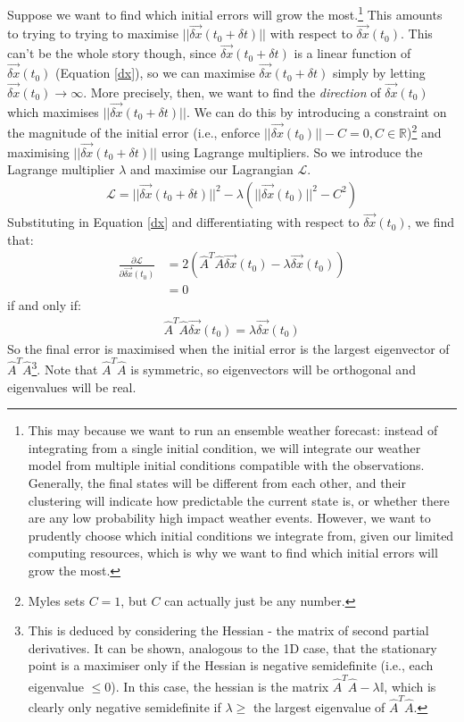 Suppose we want to find which initial errors will grow the most.\footnote{This may because we want to run an ensemble weather forecast: instead of integrating from a single initial condition, we will integrate our weather model from multiple initial conditions compatible with the observations. Generally, the final states will be different from each other, and their clustering will indicate how predictable the current state is, or whether there are any low probability high impact weather events. However, we want to prudently choose which initial conditions we integrate from, given our limited computing resources, which is why we want to find which initial errors will grow the most.}
This amounts to trying to trying to maximise $||\vec{\delta x}(t_0+\delta t)||$ with respect to $\vec{\delta x}(t_0)$. This can't be the whole story though, since $\vec{\delta x}(t_0+\delta t)$ is a linear function of $\vec{\delta x}(t_0)$ (Equation \ref{dx}), so we can maximise $\vec{\delta x}(t_0+\delta t)$ simply by letting $\vec{\delta x}(t_0)\to\infty$. More precisely, then, we want to find the \textit{direction} of $\vec{\delta x}(t_0)$ which maximises $||\vec{\delta x}(t_0+\delta t)||$. We can do this by introducing a constraint on the magnitude of the initial error (i.e., enforce $||\vec{\delta x}(t_0)||-C=0,C\in\mathbb{R}$)\footnote{Myles sets $C=1$, but $C$ can actually just be any number.} and maximising $||\vec{\delta x}(t_0+\delta t)||$ using Lagrange multipliers. So we introduce the Lagrange multiplier $\lambda$ and maximise our Lagrangian $\mathscr{L}$.
\begin{align}
    \mathscr{L}=||\vec{\delta x}(t_0+\delta t)||^2-\lambda(||\vec{\delta x}(t_0)||^2-C^2)
\end{align}
Substituting in Equation \ref{dx} and differentiating with respect to $\vec{\delta x}(t_0)$, we find that:
\begin{align*}
    \frac{\partial\mathscr{L}}{\partial\vec{\delta x
    }(t_0)}&=2(\hat{A}^T\hat{A}\vec{\delta x}(t_0)-\lambda\vec{\delta x}(t_0))\\
    &=0
\end{align*}
if and only if:
\begin{align*}
    \hat{A}^T\hat{A}\vec{\delta x}(t_0)=\lambda\vec{\delta x}(t_0)
\end{align*}
So the final error is maximised when the initial error is the largest eigenvector of $\hat{A}^T\hat{A}$\footnote{This is deduced by considering the Hessian - the matrix of second partial derivatives. It can be shown, analogous to the 1D case, that the stationary point is a maximiser only if the Hessian is negative semidefinite (i.e., each eigenvalue $\leq0$). In this case, the hessian is the matrix $\hat{A}^T\hat{A}-\lambda\mathbb{I}$, which is clearly only negative semidefinite if $\lambda\geq$ the largest eigenvalue of $\hat{A}^T\hat{A}$.}. Note that $\hat{A}^T\hat{A}$ is symmetric, so eigenvectors will be orthogonal and eigenvalues will be real. 

